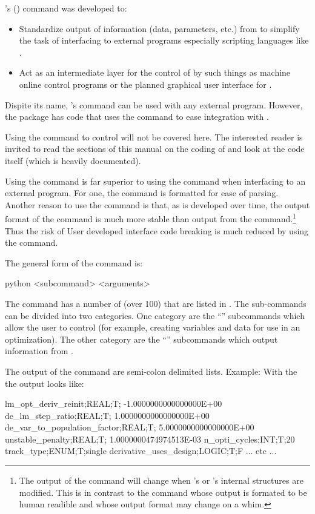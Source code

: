 \tao's  () command was developed to:
%
\begin{itemize}
\item 
Standardize output of information (data, parameters, etc.) from \tao to simplify the task of
interfacing \tao to external programs especially scripting languages like .
% 
\item 
Act as an intermediate layer for the control of \tao by such things as machine online control
programs or the planned graphical user interface for \tao.
\end{itemize}
Dispite its name, \tao's  command can be used with any external program. However, the
 package has code that uses the  command to ease integration with .

Using the  command to control \tao will not be covered here. The interested reader is
invited to read the sections of this manual on the coding of \tao and look at the \tao code itself
(which is heavily documented).

Using the  command is far superior to using the  command when interfacing to an
external program. For one, the  command is formatted for ease of parsing. Another reason
to use the  command is that, as \tao is developed over time, the output format of the
 command is much more stable than output from the  command.\footnote
  {
The output of the  command will change when \tao's or \bmad's internal structures are
modified. This is in contrast to the  command whose output is formated to be human readible
and whose output format may change on a whim.
  }
Thus the risk of User developed interface code breaking is much reduced by using the  command.

The general form of the  command is:
\begin{example}
  python <subcommand> <arguments>
\end{example}
The  command has a number of  (over 100) that are listed in
. The sub-commands can be divided into two categories. One category are the
``'' subcommands which allow the user to control \tao (for example, creating variables
and data for use in an optimization). The other category are the ``'' subcommands which
output information from \tao.

The output of the  command are semi-colon delimited lists. Example: With the
 the output looks like:
\begin{example}
  lm_opt_deriv_reinit;REAL;T; -1.0000000000000000E+00
  de_lm_step_ratio;REAL;T;  1.0000000000000000E+00
  de_var_to_population_factor;REAL;T;  5.0000000000000000E+00
  unstable_penalty;REAL;T;  1.0000000474974513E-03
  n_opti_cycles;INT;T;20
  track_type;ENUM;T;single
  derivative_uses_design;LOGIC;T;F
  ... etc ...
\end{example}

